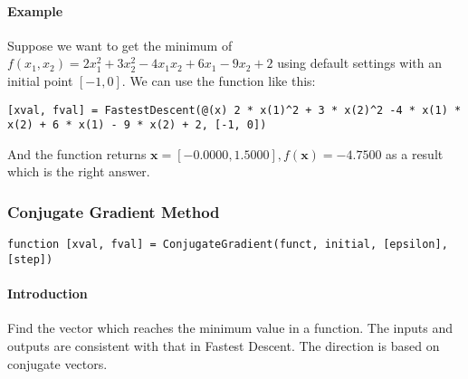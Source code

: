 \documentclass{article}
\begin{document}
\paragraph{Example}
Suppose we want to get the minimum of $f(x_1, x_2) = 2 x_1^2 + 3 x_2^2 - 4 x_1 x_2 + 6 x_1 - 9 x_2 + 2$ using default settings with an initial point $[-1, 0]$. We can use the function like this:
\begin{verbatim}
[xval, fval] = FastestDescent(@(x) 2 * x(1)^2 + 3 * x(2)^2 -4 * x(1) * x(2) + 6 * x(1) - 9 * x(2) + 2, [-1, 0])
\end{verbatim}

And the function returns $\mathbf{x} = [-0.0000, 1.5000], f(\mathbf{x}) = -4.7500$ as a result which is the right answer.

\subsubsection{Conjugate Gradient Method}
\begin{verbatim}
function [xval, fval] = ConjugateGradient(funct, initial, [epsilon], [step])
\end{verbatim}

\paragraph{Introduction}
Find the vector which reaches the minimum value in a function. The inputs and outputs are consistent with that in Fastest Descent. The direction is based on conjugate vectors.
\end{document}

